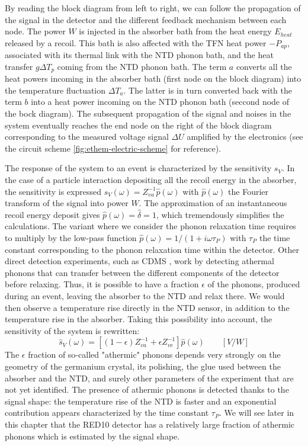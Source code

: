 By reading the block diagram from left to right, we can follow the propagation of the signal in the detector and the different feedback mechanism between each node. The power $W$ is injected in the absorber bath from the heat energy $E_{heat}$ released by a recoil. This bath is also affected with the TFN heat power $-P_{ap}$, associated with its thermal link with the NTD phonon bath, and the heat transfer $g \Delta T_p$ coming from the NTD phonon bath. The term $a$ converts all the heat powers incoming in the absorber bath (first node on the block diagram) into the temperature fluctuation $\Delta T_a$. The latter is in turn converted back with the term $b$ into a heat power incoming on the NTD phonon bath (seccond node of the bock diagram). The subsequent propagation of the signal and noises in the system eventually reaches the end node on the right of the block diagram corresponding to the measured voltage signal $\Delta U$ amplified by the electronics (see the circuit scheme \ref{fig:ethem-electric-scheme} for reference).


The response of the system to an event is characterized by the sensitivity $s_V$. In the case of a particle interaction depositing all the recoil energy in the absorber, the sensitivity is expressed ${s}_V(\omega) = Z_{va}^{-1}\hat{p}(\omega)$ with $\hat{p}(\omega)$ the Fourier transform of the signal into power $W$. The approximation of an instantaneous recoil energy deposit gives $\hat{p}(\omega) = \hat{\delta} = 1$, which tremendously simplifies the calculations.
The variant where we consider the phonon relaxation time requires to multiply by the low-pass function $\hat{p}(\omega) = 1/(1+i\omega \tau_P)$ with $\tau_P$ the time constant corresponding to the phonon relaxation time within the detector.
Other direct detection experiments, such as CDMS \cite{Billard:2012}, work by detecting athermal phonons that can transfer between the different components of the detector before relaxing. Thus, it is possible to have a fraction $\epsilon$ of the phonons, produced during an event, leaving the absorber to the NTD and relax there. We would then observe a temperature rise directly in the NTD sensor, in addition to the temperature rise in the absorber. Taking this possibility into account, the sensitivity of the system is rewritten:
\begin{equation}
\label{sv}
\hat{s}_V(\omega) = \left[(1-\epsilon) Z_{va}^{-1} + \epsilon Z_{ve}^{-1}\right]\hat{p}(\omega) \qquad [V/W]
\end{equation}
The $\epsilon$ fraction of so-called "athermic" phonons depends very strongly on the geometry of the germanium crystal, its polishing, the glue used between the absorber and the NTD, and surely other parameters of the experiment that are not yet identified. The presence of athermic phonons is detected thanks to the signal shape: the temperature rise of the NTD is faster and an exponential contribution appears characterized by the time constant $\tau_P$. We will see later in this chapter that the RED10 detector has a relatively large fraction of athermic phonons which is estimated by the signal shape.

